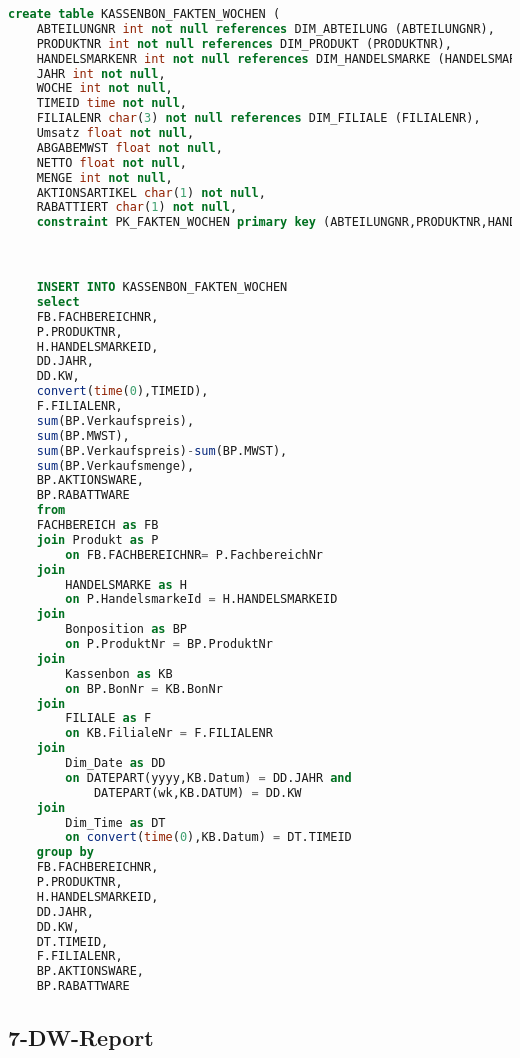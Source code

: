 \begin{lstlisting}[language=SQL]
  create table KASSENBON_FAKTEN_WOCHEN (
	ABTEILUNGNR int not null references DIM_ABTEILUNG (ABTEILUNGNR),
	PRODUKTNR int not null references DIM_PRODUKT (PRODUKTNR),
	HANDELSMARKENR int not null references DIM_HANDELSMARKE (HANDELSMARKENR),
	JAHR int not null,
	WOCHE int not null,
    TIMEID time not null,
	FILIALENR char(3) not null references DIM_FILIALE (FILIALENR),
	Umsatz float not null,
	ABGABEMWST float not null,
	NETTO float not null,
	MENGE int not null,
	AKTIONSARTIKEL char(1) not null,
	RABATTIERT char(1) not null,
	constraint PK_FAKTEN_WOCHEN primary key (ABTEILUNGNR,PRODUKTNR,HANDELSMARKENR, JAHR, TIMEID, WOCHE,FILIALENR))



	INSERT INTO KASSENBON_FAKTEN_WOCHEN
	select
	FB.FACHBEREICHNR,
	P.PRODUKTNR,
	H.HANDELSMARKEID,
	DD.JAHR,
	DD.KW,
    convert(time(0),TIMEID),
	F.FILIALENR,
	sum(BP.Verkaufspreis),
	sum(BP.MWST),
	sum(BP.Verkaufspreis)-sum(BP.MWST),
	sum(BP.Verkaufsmenge),
	BP.AKTIONSWARE,
	BP.RABATTWARE
	from
	FACHBEREICH as FB
	join Produkt as P
		on FB.FACHBEREICHNR= P.FachbereichNr
	join
		HANDELSMARKE as H
		on P.HandelsmarkeId = H.HANDELSMARKEID
	join
		Bonposition as BP
		on P.ProduktNr = BP.ProduktNr
	join
		Kassenbon as KB
		on BP.BonNr = KB.BonNr
	join
		FILIALE as F
		on KB.FilialeNr = F.FILIALENR
	join
		Dim_Date as DD
		on DATEPART(yyyy,KB.Datum) = DD.JAHR and
			DATEPART(wk,KB.DATUM) = DD.KW
	join
		Dim_Time as DT
		on convert(time(0),KB.Datum) = DT.TIMEID
	group by
	FB.FACHBEREICHNR,
	P.PRODUKTNR,
	H.HANDELSMARKEID,
	DD.JAHR,
	DD.KW,
    DT.TIMEID,
	F.FILIALENR,
	BP.AKTIONSWARE,
	BP.RABATTWARE
\end{lstlisting}



\subsection{7-DW-Report}

